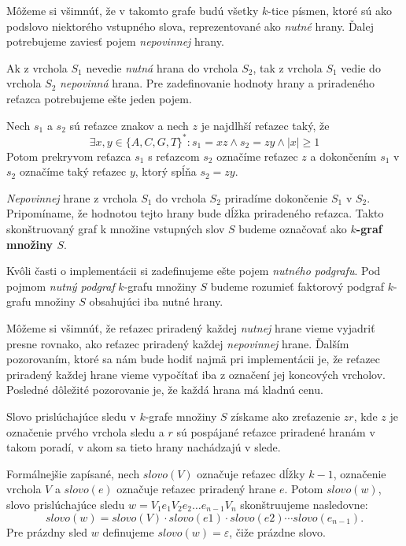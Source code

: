 Môžeme si všimnúť, že v takomto grafe budú všetky $k$-tice písmen, ktoré sú
ako podslovo niektorého vstupného slova, reprezentované ako \emph{nutné} hrany. Ďalej
potrebujeme zaviesť pojem \emph{nepovinnej} hrany.

Ak z vrchola $S_1$ nevedie \emph{nutná} hrana do vrchola $S_2$, tak z vrchola
$S_1$ vedie do vrchola $S_2$ \emph{nepovinná} hrana. Pre zadefinovanie hodnoty
hrany a priradeného reťazca potrebujeme ešte jeden pojem.

\begin{defn}
Nech $s_1$ a $s_2$ sú reťazce znakov a nech $z$ je najdlhší reťazec taký, že
$$\exists x, y \in \{A, C, G, T\}^*: s_1 = xz \wedge s_2 = zy \wedge |x| \ge 1 $$
Potom prekryvom reťazca $s_1$ s reťazcom $s_2$ označíme reťazec $z$ a dokončením $s_1$ v $s_2$ označíme
taký reťazec $y$, ktorý spĺňa $s_2 = zy$.
\end{defn}

\emph{Nepovinnej} hrane z vrchola $S_1$ do vrchola $S_2$ priradíme dokončenie $S_1$ v
$S_2$. Pripomíname, že hodnotou tejto hrany bude dĺžka priradeného reťazca.
Takto skonštruovaný graf k množine vstupných slov $S$ budeme označovať ako
\textbf{\boldmath$k$-graf množiny \boldmath$S$}.

Kvôli časti o implementácii si zadefinujeme ešte pojem \emph{nutného podgrafu}.
Pod pojmom \emph{nutný podgraf} $k$-grafu množiny $S$ budeme rozumieť faktorový
podgraf $k$-grafu množiny $S$ obsahujúci iba nutné hrany.

Môžeme si všimnúť, že reťazec priradený každej \emph{nutnej} hrane vieme vyjadriť
presne rovnako, ako reťazec priradený každej \emph{nepovinnej} hrane. Ďalším pozorovaním,
ktoré sa nám bude hodiť najmä pri implementácii je, že reťazec priradený každej
hrane vieme vypočítať iba z označení jej koncových vrcholov. Posledné dôležité
pozorovanie je, že každá hrana má kladnú cenu.

Slovo prislúchajúce sledu v $k$-grafe množiny $S$ získame ako zreťazenie $zr$, kde $z$ je
označenie prvého vrchola sledu a $r$ sú pospájané reťazce priradené hranám v takom
poradí, v akom sa tieto hrany nachádzajú v slede.

Formálnejšie zapísané, nech $slovo(V)$ označuje reťazec dĺžky $k-1$, označenie vrchola
$V$ a $slovo(e)$ označuje reťazec priradený hrane $e$. Potom $slovo(w)$, slovo
prislúchajúce sledu $w = V_1 e_1 V_2 e_2 \ldots e_{n-1} V_n$ skonštruujeme nasledovne: 
$$slovo(w) = slovo(V) \cdot slovo(e1) \cdot slovo(e2) \cdots slovo(e_{n-1}).$$
Pre prázdny sled $w$ definujeme $slovo(w) = \varepsilon$, čiže prázdne slovo.

